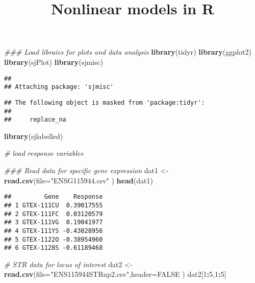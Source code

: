 \documentclass[
]{article}
\title{Nonlinear models in R}
\author{}
\date{\vspace{-2.5em}}
\newenvironment{Shaded}{\begin{snugshade}}{\end{snugshade}}
\newcommand{\CommentTok}[1]{\textcolor[rgb]{0.56,0.35,0.01}{\textit{#1}}}
\newcommand{\DataTypeTok}[1]{\textcolor[rgb]{0.13,0.29,0.53}{#1}}
\newcommand{\DecValTok}[1]{\textcolor[rgb]{0.00,0.00,0.81}{#1}}
\newcommand{\KeywordTok}[1]{\textcolor[rgb]{0.13,0.29,0.53}{\textbf{#1}}}
\newcommand{\NormalTok}[1]{#1}
\newcommand{\OperatorTok}[1]{\textcolor[rgb]{0.81,0.36,0.00}{\textbf{#1}}}
\newcommand{\OtherTok}[1]{\textcolor[rgb]{0.56,0.35,0.01}{#1}}
\newcommand{\StringTok}[1]{\textcolor[rgb]{0.31,0.60,0.02}{#1}}
\begin{document}
\maketitle

\begin{Shaded}
\begin{Highlighting}[]
\CommentTok{### Load libraies for plots and data analysis}
\KeywordTok{library}\NormalTok{(tidyr)}
\KeywordTok{library}\NormalTok{(ggplot2)}
\KeywordTok{library}\NormalTok{(sjPlot)}
\KeywordTok{library}\NormalTok{(sjmisc)}
\end{Highlighting}
\end{Shaded}

\begin{verbatim}
## 
## Attaching package: 'sjmisc'
\end{verbatim}

\begin{verbatim}
## The following object is masked from 'package:tidyr':
## 
##     replace_na
\end{verbatim}

\begin{Shaded}
\begin{Highlighting}[]
\KeywordTok{library}\NormalTok{(sjlabelled)}

\CommentTok{# load response variables}

\CommentTok{### Read data for specific gene expression}
\NormalTok{dat1 <-}\StringTok{ }\KeywordTok{read.csv}\NormalTok{(}\DataTypeTok{file=}\StringTok{"ENSG115944.csv"}\NormalTok{ )}
\KeywordTok{head}\NormalTok{(dat1)}
\end{Highlighting}
\end{Shaded}

\begin{verbatim}
##         Gene    Response
## 1 GTEX-111CU  0.39017555
## 2 GTEX-111FC  0.03120579
## 3 GTEX-111VG  0.19041977
## 4 GTEX-111YS -0.43028956
## 5 GTEX-1122O -0.38954960
## 6 GTEX-1128S -0.61189468
\end{verbatim}

\begin{Shaded}
\begin{Highlighting}[]
\CommentTok{# STR data for locus of interest}
\NormalTok{dat2 <-}\StringTok{ }\KeywordTok{read.csv}\NormalTok{(}\DataTypeTok{file=}\StringTok{"ENS115944STRup2.csv"}\NormalTok{,}\DataTypeTok{header=}\OtherTok{FALSE}\NormalTok{ )}
\NormalTok{dat2[}\DecValTok{1}\OperatorTok{:}\DecValTok{5}\NormalTok{,}\DecValTok{1}\OperatorTok{:}\DecValTok{5}\NormalTok{]}
\end{Highlighting}
\end{Shaded}
\end{document}
